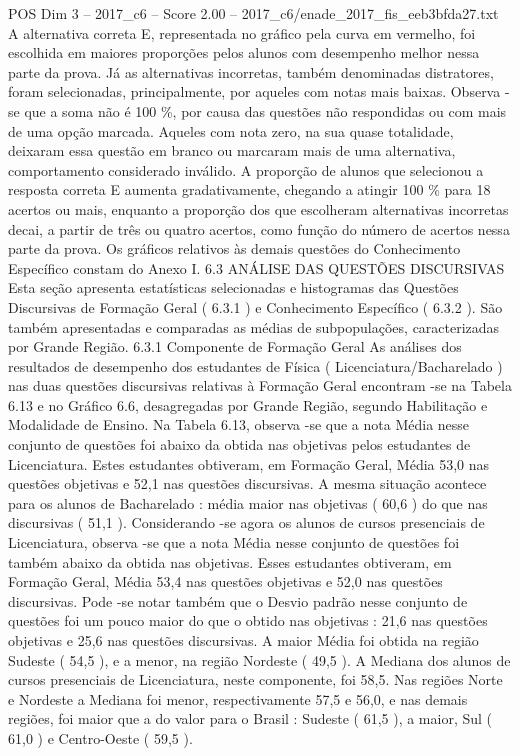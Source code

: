 \begin{textsample}{POS Dim 3 – 2017\_c6 – Score 2.00 – 2017\_c6/enade\_2017\_fis\_eeb3bfda27.txt}
A alternativa correta E, representada no gráfico pela curva em vermelho, foi escolhida em maiores proporções pelos alunos com desempenho melhor nessa parte da prova.
Já as alternativas incorretas, também denominadas distratores, foram selecionadas, principalmente, por aqueles com notas mais baixas.
Observa -se que a soma não é 100 \%, por causa das questões não respondidas ou com mais de uma opção marcada.
Aqueles com nota zero, na sua quase totalidade, deixaram essa questão em branco ou marcaram mais de uma alternativa, comportamento considerado inválido.
A proporção de alunos que selecionou a resposta correta E aumenta gradativamente, chegando a atingir 100 \% para 18 acertos ou mais, enquanto a proporção dos que escolheram alternativas incorretas decai, a partir de três ou quatro acertos, como função do número de acertos nessa parte da prova.
Os gráficos relativos às demais questões do Conhecimento Específico constam do Anexo I. 6.3 ANÁLISE DAS QUESTÕES DISCURSIVAS Esta seção apresenta estatísticas selecionadas e histogramas das Questões Discursivas de Formação Geral ( 6.3.1 ) e Conhecimento Específico ( 6.3.2 ).
São também apresentadas e comparadas as médias de subpopulações, caracterizadas por Grande Região. 6.3.1 Componente de Formação Geral As análises dos resultados de desempenho dos estudantes de Física ( Licenciatura/Bacharelado ) nas duas questões discursivas relativas à Formação Geral encontram -se na Tabela 6.13 e no Gráfico 6.6, desagregadas por Grande Região, segundo Habilitação e Modalidade de Ensino.
Na Tabela 6.13, observa -se que a nota Média nesse conjunto de questões foi abaixo da obtida nas objetivas pelos estudantes de Licenciatura.
Estes estudantes obtiveram, em Formação Geral, Média 53,0 nas questões objetivas e 52,1 nas questões discursivas.
A mesma situação acontece para os alunos de Bacharelado : média maior nas objetivas ( 60,6 ) do que nas discursivas ( 51,1 ).
Considerando -se agora os alunos de cursos presenciais de Licenciatura, observa -se que a nota Média nesse conjunto de questões foi também abaixo da obtida nas objetivas.
Esses estudantes obtiveram, em Formação Geral, Média 53,4 nas questões objetivas e 52,0 nas questões discursivas.
Pode -se notar também que o Desvio padrão nesse conjunto de questões foi um pouco maior do que o obtido nas objetivas : 21,6 nas questões objetivas e 25,6 nas questões discursivas.
A maior Média foi obtida na região Sudeste ( 54,5 ), e a menor, na região Nordeste ( 49,5 ).
A Mediana dos alunos de cursos presenciais de Licenciatura, neste componente, foi 58,5.
Nas regiões Norte e Nordeste a Mediana foi menor, respectivamente 57,5 e 56,0, e nas demais regiões, foi maior que a do valor para o Brasil : Sudeste ( 61,5 ), a maior, Sul ( 61,0 ) e Centro-Oeste ( 59,5 ).

\end{textsample}
